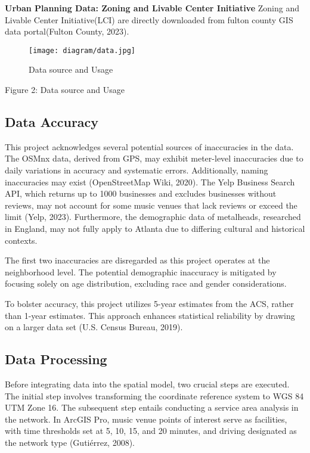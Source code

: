 \documentclass[11pt]{article}
\begin{document}
\textbf{Urban Planning Data: Zoning and Livable Center Initiative}
Zoning and Livable Center Initiative(LCI) are directly downloaded from fulton county GIS data portal(Fulton County, 2023).

\begin{figure}[H]
\begin{center}
\centering
\texttt{[image: diagram/data.jpg]}
\caption{Data source and Usage}
\label{fig:figure1}
\end{center}
\end{figure}

\begin{center}
\centering
Figure 2: Data source and Usage
\end{center}


\subsection{Data Accuracy}

This project acknowledges several potential sources of inaccuracies in the data. The OSMnx data, derived from GPS, may exhibit meter-level inaccuracies due to daily variations in accuracy and systematic errors. Additionally, naming inaccuracies may exist (OpenStreetMap Wiki, 2020). The Yelp Business Search API, which returns up to 1000 businesses and excludes businesses without reviews, may not account for some music venues that lack reviews or exceed the limit (Yelp, 2023). Furthermore, the demographic data of metalheads, researched in England, may not fully apply to Atlanta due to differing cultural and historical contexts.

The first two inaccuracies are disregarded as this project operates at the neighborhood level. The potential demographic inaccuracy is mitigated by focusing solely on age distribution, excluding race and gender considerations.

To bolster accuracy, this project utilizes 5-year estimates from the ACS, rather than 1-year estimates. This approach enhances statistical reliability by drawing on a larger data set (U.S. Census Bureau, 2019).

\subsection{Data Processing}

Before integrating data into the spatial model, two crucial steps are executed. The initial step involves transforming the coordinate reference system to WGS 84 UTM Zone 16. The subsequent step entails conducting a service area analysis in the network. In ArcGIS Pro, music venue points of interest serve as facilities, with time thresholds set at 5, 10, 15, and 20 minutes, and driving designated as the network type (Gutiérrez, 2008).
\end{document}
